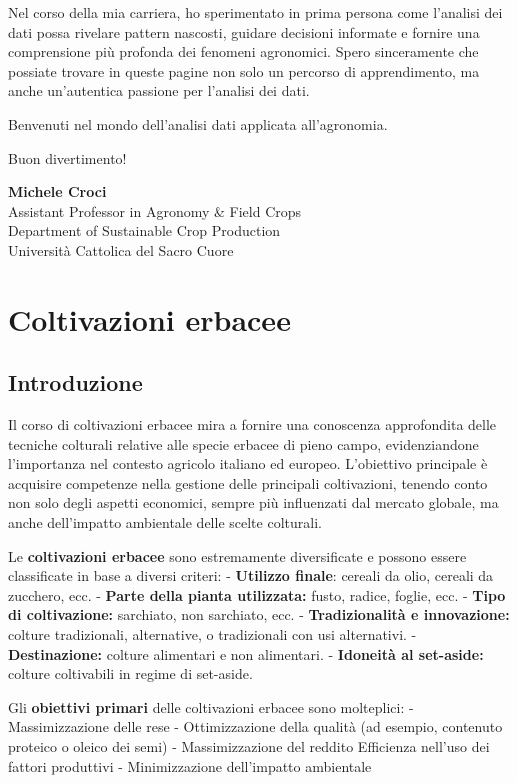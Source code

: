 \documentclass[
]{book}
\theoremstyle{definition}
\theoremstyle{definition}
\theoremstyle{definition}
\theoremstyle{definition}
\theoremstyle{remark}
\begin{document}
Nel corso della mia carriera, ho sperimentato in prima persona come l'analisi dei dati possa rivelare pattern nascosti, guidare decisioni informate e fornire una comprensione più profonda dei fenomeni agronomici. Spero sinceramente che possiate trovare in queste pagine non solo un percorso di apprendimento, ma anche un'autentica passione per l'analisi dei dati.

Benvenuti nel mondo dell'analisi dati applicata all'agronomia.

Buon divertimento!

\textbf{Michele Croci}\\
Assistant Professor in Agronomy \& Field Crops\\
Department of Sustainable Crop Production\\
Università Cattolica del Sacro Cuore

\hypertarget{coltivazioni-erbacee}{%
\chapter{Coltivazioni erbacee}\label{coltivazioni-erbacee}}

\hypertarget{introduzione}{%
\section{Introduzione}\label{introduzione}}

Il corso di coltivazioni erbacee mira a fornire una conoscenza approfondita delle tecniche colturali relative alle specie erbacee di pieno campo, evidenziandone l'importanza nel contesto agricolo italiano ed europeo. L'obiettivo principale è acquisire competenze nella gestione delle principali coltivazioni, tenendo conto non solo degli aspetti economici, sempre più influenzati dal mercato globale, ma anche dell'impatto ambientale delle scelte colturali.

Le \textbf{coltivazioni erbacee} sono estremamente diversificate e possono essere classificate in base a diversi criteri: - \textbf{Utilizzo finale}: cereali da olio, cereali da zucchero, ecc. - \textbf{Parte della pianta utilizzata:} fusto, radice, foglie, ecc. - \textbf{Tipo di coltivazione:} sarchiato, non sarchiato, ecc. - \textbf{Tradizionalità e innovazione:} colture tradizionali, alternative, o tradizionali con usi alternativi. - \textbf{Destinazione:} colture alimentari e non alimentari. - \textbf{Idoneità al set-aside:} colture coltivabili in regime di set-aside.

Gli \textbf{obiettivi primari} delle coltivazioni erbacee sono molteplici: - Massimizzazione delle rese - Ottimizzazione della qualità (ad esempio, contenuto proteico o oleico dei semi) - Massimizzazione del reddito Efficienza nell'uso dei fattori produttivi - Minimizzazione dell'impatto ambientale
\end{document}
